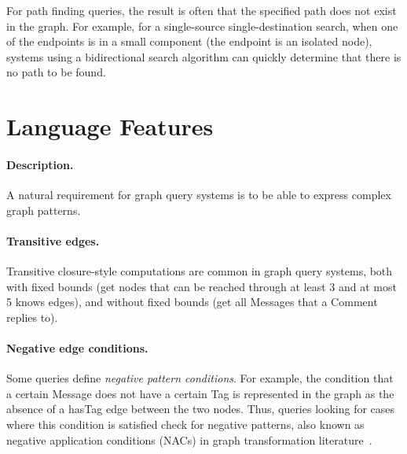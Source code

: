 For path finding queries, the result is often that the specified path does not exist in the graph.
For example, for a single-source single-destination search, when one of the endpoints is in a small component (\eg the endpoint is an isolated node), systems using a bidirectional search algorithm can quickly determine that there is no path to be found.




\section{Language Features}




\paragraph{Description.}

A natural requirement for graph query systems is to be able to express complex
graph patterns.

\paragraph{Transitive edges.} Transitive closure-style computations are common in graph query systems, both with fixed bounds
(\eg get nodes that can be reached through at least 3 and at most 5 \textsf{knows} edges),
and without fixed bounds
(\eg get all \textsf{Messages} that a \textsf{Comment} replies to).

\paragraph{Negative edge conditions.} Some queries define \emph{negative pattern conditions}. For example, the condition that a certain \textsf{Message} does not have a certain \textsf{Tag} is represented in the graph as the absence of a \textsf{hasTag} edge between the two nodes. Thus, queries looking for cases where this condition is satisfied check for negative patterns, also known as negative application conditions (NACs) in graph transformation literature~\cite{DBLP:journals/fuin/HabelHT96}.


